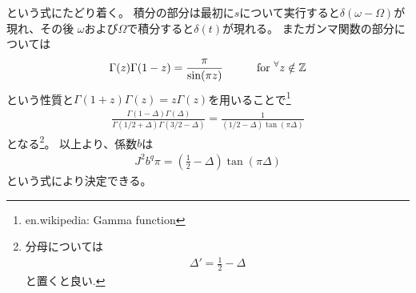 \documentclass[a4j]{ltjsarticle}
\begin{document}
	という式にたどり着く。
	積分の部分は最初に$s$について実行すると$\delta(\omega - \Omega)$が現れ、その後
	$\omega$および$\Omega$で積分すると$\delta(t)$が現れる。
	またガンマ関数の部分については
	\begin{align}
	\Gamma(z)\Gamma(1 - z) = \frac{\pi}{\sin(\pi z)}
	\hspace{30pt}
	{\rm for}\ {}^{\forall}z \notin \mathbb{Z}
	\end{align}
	という性質と$\Gamma(1 + z)\Gamma(z) = z\Gamma(z)$を用いることで\footnote{en.wikipedia: Gamma function}
	\begin{align}
	\frac{\Gamma(1 - \Delta)\Gamma(\Delta)}{\Gamma(1/2 + \Delta)\Gamma(3/2 - \Delta)}
	= \frac{1}{(1/2 - \Delta) \tan(\pi\Delta)}
	\end{align}
	となる\footnote{分母については
	\begin{align}
	\Delta' = \frac{1}{2} - \Delta
	\end{align}と置くと良い.}。
	以上より、係数$b$は
	\begin{align}
	J^2b^q\pi = \left(\frac{1}{2} - \Delta\right)\tan(\pi\Delta)
	\end{align}
	という式により決定できる。
\end{document}
